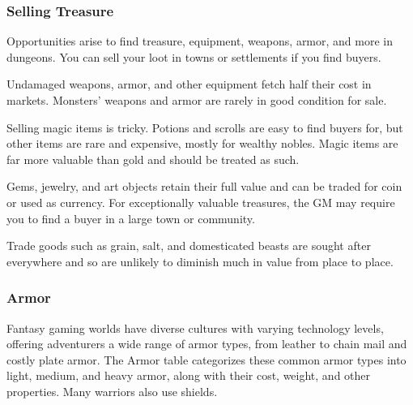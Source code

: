 \subsubsection{Selling Treasure}\label{equipment-selling-treasure}

Opportunities arise to find treasure, equipment, weapons, armor, and
more in dungeons. You can sell your loot in towns or settlements if you
find buyers.

Undamaged weapons, armor, and other equipment fetch half their cost in
markets. Monsters' weapons and armor are rarely in good condition for
sale.

Selling magic items is tricky. Potions and scrolls are easy to find
buyers for, but other items are rare and expensive, mostly for wealthy
nobles. Magic items are far more valuable than gold and should be
treated as such.

Gems, jewelry, and art objects retain their full value and can be traded
for coin or used as currency. For exceptionally valuable treasures, the
GM may require you to find a buyer in a large town or community.

Trade goods such as grain, salt, and domesticated beasts are sought
after everywhere and so are unlikely to diminish much in value from
place to place.

\subsubsection{Armor}\label{equipment-armor}

Fantasy gaming worlds have diverse cultures with varying technology
levels, offering adventurers a wide range of armor types, from leather
to chain mail and costly plate armor. The Armor table categorizes these
common armor types into light, medium, and heavy armor, along with their
cost, weight, and other properties. Many warriors also use shields.

